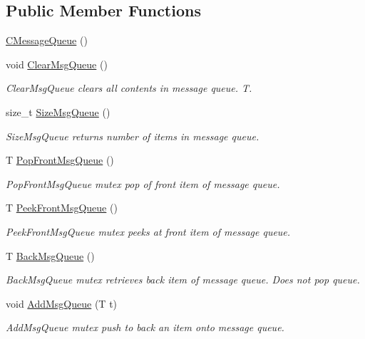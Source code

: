\subsection*{Public Member Functions}
\begin{DoxyCompactItemize}
\item 
\hyperlink{classRCS_1_1CMessageQueue_afa0f086027abffe37b9e9673396f7b00}{C\-Message\-Queue} ()
\item 
void \hyperlink{classRCS_1_1CMessageQueue_a1fbabdd6e6aaf02572a93531ed871559}{Clear\-Msg\-Queue} ()
\begin{DoxyCompactList}\small\item\em Clear\-Msg\-Queue clears all contents in message queue. T. \end{DoxyCompactList}\item 
size\-\_\-t \hyperlink{classRCS_1_1CMessageQueue_a7929c4ce871eab3dfb8dfabd5bf4bdb9}{Size\-Msg\-Queue} ()
\begin{DoxyCompactList}\small\item\em Size\-Msg\-Queue returns number of items in message queue. \end{DoxyCompactList}\item 
T \hyperlink{classRCS_1_1CMessageQueue_afbde6b0fa4044557ba5f990c69d52ff7}{Pop\-Front\-Msg\-Queue} ()
\begin{DoxyCompactList}\small\item\em Pop\-Front\-Msg\-Queue mutex pop of front item of message queue. \end{DoxyCompactList}\item 
T \hyperlink{classRCS_1_1CMessageQueue_a1c01196dadf55e07e7507a552b94a452}{Peek\-Front\-Msg\-Queue} ()
\begin{DoxyCompactList}\small\item\em Peek\-Front\-Msg\-Queue mutex peeks at front item of message queue. \end{DoxyCompactList}\item 
T \hyperlink{classRCS_1_1CMessageQueue_a5d669a3cecd23be9113567421f2b06a1}{Back\-Msg\-Queue} ()
\begin{DoxyCompactList}\small\item\em Back\-Msg\-Queue mutex retrieves back item of message queue. Does not pop queue. \end{DoxyCompactList}\item 
void \hyperlink{classRCS_1_1CMessageQueue_a1f23fdbd7b3c7c3861abea8fb0899288}{Add\-Msg\-Queue} (T t)
\begin{DoxyCompactList}\small\item\em Add\-Msg\-Queue mutex push to back an item onto message queue. \end{DoxyCompactList}\item 

\end{DoxyCompactItemize}
